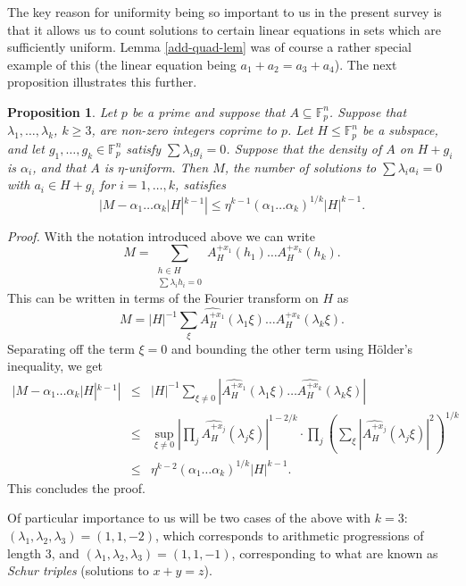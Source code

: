 \documentclass[12pt,a4paper,reqno]{amsart}
\numberwithin{equation}{section}
\theoremstyle{plain}
\newtheorem{proposition}[subsection]{Proposition}
\theoremstyle{definition}
\renewcommand{\leq}{\leqslant}
\renewcommand{\geq}{\geqslant}
\def\proof{\noindent\textit{Proof. }}
\def\endproof{\hfill{\usebox{\proofbox}}}
\begin{document}
\noindent The key reason for uniformity being so important to us in the present survey is that it allows us to count solutions to certain linear equations in sets which are sufficiently uniform. Lemma \ref{add-quad-lem} was of course a rather special example of this (the linear equation being $a_1 + a_2 = a_3 + a_4$).  The next proposition illustrates this further.

\begin{proposition}\label{prop3.3}
Let $p$ be a prime and suppose that $A \subseteq \mathbb{F}_p^n$. Suppose that $\lambda_1,\dots,\lambda_k$, $k \geq 3$, are non-zero integers coprime to $p$. Let $H \leq \mathbb{F}_p^n$ be a subspace, and let $g_1,\dots,g_k \in \mathbb{F}_p^n$ satisfy $\sum \lambda_i g_i = 0$. Suppose that the density of $A$ on $H + g_i$ is $\alpha_i$, and that $A$ is $\eta$-uniform. Then $M$, the number of solutions to $\sum \lambda_i a_i = 0$ with $a_i \in H + g_i$ for $i = 1,\dots,k$, satisfies
\[ |M - \alpha_1 \dots \alpha_k |H|^{k-1}| \leq \eta^{k-1} (\alpha_1 \dots \alpha_k)^{1/k} |H|^{k-1}.\]
\end{proposition}
\proof With the notation introduced above we can write
\[ M = \sum_{\substack {h \in H \\ \sum \lambda_i h_i = 0 }} A_H^{+ x_1}(h_1) \dots A_H^{+x_k}(h_k).\]
This can be written in terms of the Fourier transform on $H$ as
\[ M = |H|^{-1}\sum_{\xi} \widehat{A_H^{+x_1}}(\lambda_1 \xi)\dots\widehat{A_H^{+x_k}}(\lambda_k \xi).\]
Separating off the term $\xi = 0$ and bounding the other term using H\"older's inequality, we get
\begin{eqnarray*}
|M - \alpha_1 \dots \alpha_k |H|^{k-1}| & \leq & |H|^{-1}\sum_{\xi \neq 0} |\widehat{A_H^{+x_1}}(\lambda_1 \xi)\dots\widehat{A_H^{+x_k}}(\lambda_k \xi)| \\ & \leq & \sup_{\xi \neq 0} |\prod_j \widehat{A_H^{+x_j}}(\lambda_j \xi)|^{1 - 2/k} \cdot \prod_{j} (\sum_{\xi} |\widehat{A_H^{+x_j}}(\lambda_j \xi)|^2)^{1/k}\\ & \leq & \eta^{k-2} (\alpha_1 \dots \alpha_k)^{1/k} |H|^{k-1}.
\end{eqnarray*}
This concludes the proof.\endproof\vspace{11pt}

\noindent Of particular importance to us will be two cases of the above with $k = 3$: $(\lambda_1,\lambda_2,\lambda_3) = (1,1,-2)$, which corresponds to arithmetic progressions of length 3, and $(\lambda_1,\lambda_2,\lambda_3) = (1,1,-1)$, corresponding to what are known as \textit{Schur triples} (solutions to $x + y = z$).\vspace{11pt}
\end{document}
